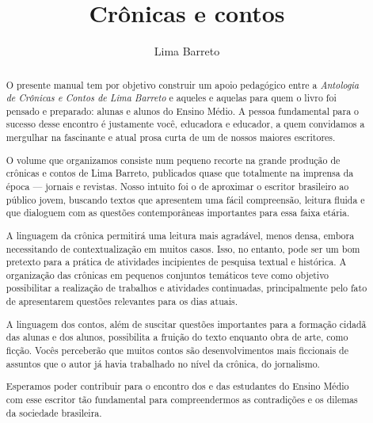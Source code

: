\documentclass{extarticle}
\newcommand{\AutorLivro}{Lima Barreto}
\newcommand{\TituloLivro}{Crônicas e contos}
\newcommand{\colaborador}{\textit{Fulano de Tal} é uma pessoa incrível e vai fazer um bom serviço.}
\begin{document}
\title{\TituloLivro}
\author{\AutorLivro}
\def\authornotes{\colaborador}

\date{}
\maketitle


\begin{abstract}

O presente manual tem por objetivo construir um apoio pedagógico entre a
\emph{Antologia de Crônicas e Contos de Lima Barreto} e aqueles e
aquelas para quem o livro foi pensado e preparado: alunas e alunos do
Ensino Médio. A pessoa fundamental para o sucesso desse encontro é
justamente você, educadora e educador, a quem convidamos a mergulhar na
fascinante e atual prosa curta de um de nossos maiores escritores.

O volume que organizamos consiste num pequeno recorte na grande produção
de crônicas e contos de Lima Barreto, publicados quase que totalmente na
imprensa da época --- jornais e revistas. Nosso intuito foi o de
aproximar o escritor brasileiro ao público jovem, buscando textos que
apresentem uma fácil compreensão, leitura fluida e que dialoguem com as
questões contemporâneas importantes para essa faixa etária.


A linguagem da crônica permitirá uma leitura mais agradável, menos
densa, embora necessitando de contextualização em muitos casos. Isso, no
entanto, pode ser um bom pretexto para a prática de atividades
incipientes de pesquisa textual e histórica. A organização das crônicas
em pequenos conjuntos temáticos teve como objetivo possibilitar a
realização de trabalhos e atividades continuadas, principalmente pelo
fato de apresentarem questões relevantes para os dias atuais.

A linguagem dos contos, além de suscitar questões importantes para a
formação cidadã das alunas e dos alunos, possibilita a fruição do texto
enquanto obra de arte, como ficção. Vocês perceberão que muitos contos
são desenvolvimentos mais ficcionais de assuntos que o autor já havia
trabalhado no nível da crônica, do jornalismo.

Esperamos poder contribuir para o encontro dos e das estudantes do
Ensino Médio com esse escritor tão fundamental para compreendermos as
contradições e os dilemas da sociedade brasileira.

\end{abstract}


\tableofcontents
\end{document}
